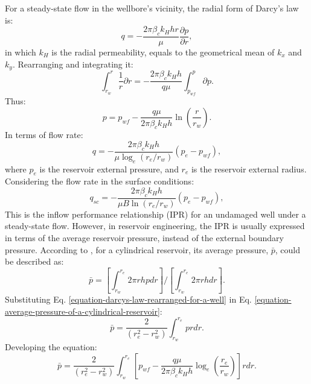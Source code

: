 For a steady-state flow in the wellbore's vicinity, the radial form of Darcy's law is:
%
\begin{equation}
	q=-\frac{2\pi\beta_c k_H h r}{\mu} \frac{\partial p}{\partial r},
\end{equation}
%
in which $k_H$ is the radial permeability, equals to the geometrical mean of $k_x$ and $k_y$.
%
Rearranging and integrating it:
%
\begin{equation}
	\int_{r_w}^{r}\frac{1}{r}\partial r = -\frac{2\pi\beta_c k_H h}{q \mu}\int_{p_{wf}}^{p}\partial p.
\end{equation}
%
Thus:
%
%
\begin{equation}
	\label{equation-darcys-law-rearranged-for-a-well}
	p=p_{wf}-\frac{q \mu}{2 \pi \beta_c k_H h}\ln\left(\frac{r}{r_w}\right).
\end{equation}
%
In terms of flow rate:
%
%
\begin{equation}
	q=-\frac{2\pi\beta_c k_H h}{\mu \log_e(r_e/r_w)} (p_e - p_{wf}),
\end{equation}
%
where $p_e$ is the reservoir external pressure, and $r_e$ is the reservoir external radius. Considering the flow rate in the surface conditions:
%
\begin{equation}
	q_{sc}=-\frac{2\pi\beta_c k_H h}{\mu B \ln(r_e/r_w)} (p_e - p_{wf}),
\end{equation}
%
This is the inflow performance relationship (IPR) for an undamaged well under a steady-state flow.
%
However, in reservoir engineering, the IPR is usually expressed in terms of the average reservoir pressure, instead of the external boundary pressure.
%
According to \cite{Ertekin2001}, for a cylindrical reservoir, its average pressure, $\bar{p}$, could be described as:
%
\begin{equation}
	\label{equation-average-pressure-of-a-cylindrical-reservoir}
	\bar{p}=\left[ \int_{r_w}^{r_e} 2 \pi r h p dr \right]/\left[ \int_{r_w}^{r_e} 2 \pi r h dr \right].
\end{equation}
%
Substituting Eq. \ref{equation-darcys-law-rearranged-for-a-well} in Eq. \ref{equation-average-pressure-of-a-cylindrical-reservoir}:
%
\begin{equation}
	\bar{p}=\frac{2}{(r_e^2-r_w^2)} \int_{r_w}^{r_e} p r dr.
\end{equation}
%
Developing the equation:
%
\begin{equation}
	\bar{p}=\frac{2}{(r_e^2-r_w^2)} \int_{r_w}^{r_e} \left[ p_{wf} - \frac{q \mu}{2 \pi \beta_c k_H h} \log_e \left(\frac{r_e}{r_w}\right) \right] r dr.
\end{equation}
